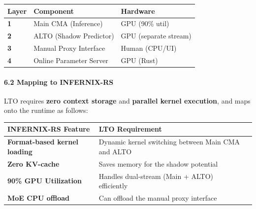 \documentclass[
  11pt,
  a4paper,
]{article}
\begin{document}
\begin{longtable}[]{@{}lll@{}}
\toprule\noalign{}
Layer & Component & Hardware \\
\midrule\noalign{}
\endhead
\bottomrule\noalign{}
\endlastfoot
\textbf{1} & Main CMA (Inference) & GPU (90\% util) \\
\textbf{2} & ALTO (Shadow Predictor) & GPU (separate stream) \\
\textbf{3} & Manual Proxy Interface & Human (CPU/UI) \\
\textbf{4} & Online Parameter Server & GPU (Rust) \\
\end{longtable}

\paragraph{6.2 Mapping to INFERNIX-RS}\label{mapping-to-infernix-rs}

LTO requires \textbf{zero context storage} and \textbf{parallel kernel
execution}, and maps onto the runtime as follows:

\begin{longtable}[]{@{}
  >{\raggedright\arraybackslash}p{}
  >{\raggedright\arraybackslash}p{}
  >{\raggedright\arraybackslash}p{}@{}}
\toprule\noalign{}
\begin{minipage}[b]{\linewidth}\raggedright
INFERNIX-RS Feature
\end{minipage} & \begin{minipage}[b]{\linewidth}\raggedright
LTO Requirement
\end{minipage} & \begin{minipage}[b]{\linewidth}\raggedright
\end{minipage} \\
\midrule\noalign{}
\endhead
\bottomrule\noalign{}
\endlastfoot
\textbf{Format-based kernel loading} & Dynamic kernel switching between
Main CMA and ALTO & \\
\textbf{Zero KV-cache} & Saves memory for the shadow potential & \\
\textbf{90\% GPU Utilization} & Handles dual-stream (Main + ALTO)
efficiently & \\
\textbf{MoE CPU offload} & Can offload the manual proxy interface & \\
\end{longtable}
\end{document}
